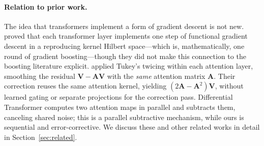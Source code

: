 \documentclass{article}
\theoremstyle{definition}
\begin{document}
\paragraph{Relation to prior work.}
The idea that transformers implement a form of gradient descent is not new.
\citet{cheng2024transformers} proved that each transformer layer implements one step of functional gradient descent in a reproducing kernel Hilbert space---which is, mathematically, one round of gradient boosting---though they did not make this connection to the boosting literature explicit.
\citet{abdullaev2025twicing} applied Tukey's twicing \citep{tukey1977exploratory} within each attention layer, smoothing the residual $\mathbf{V} - \mathbf{A}\mathbf{V}$ with the \emph{same} attention matrix $\mathbf{A}$.
Their correction reuses the same attention kernel, yielding $(2\mathbf{A} - \mathbf{A}^2)\mathbf{V}$, without learned gating or separate projections for the correction pass.
Differential Transformer \citep{ye2025differential} computes two attention maps in parallel and subtracts them, canceling shared noise; this is a parallel subtractive mechanism, while ours is sequential and error-corrective.
We discuss these and other related works in detail in Section~\ref{sec:related}.
\end{document}
